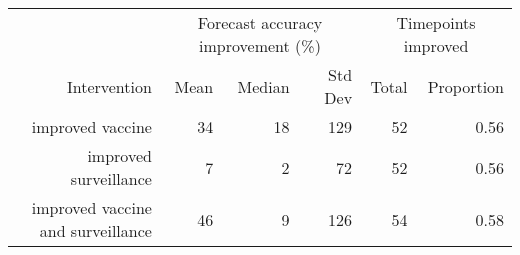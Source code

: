 
\begin{tabular*}{1.0\textwidth}{rrrrrr}
\toprule
             & \multicolumn{3}{c}{Forecast accuracy improvement (\%)} & \multicolumn{2}{c}{Timepoints improved} \\
Intervention & Mean & Median & Std Dev & Total & Proportion \\
\midrule

improved vaccine & 34 & 18 & 129 & 52 & 0.56 \\
improved surveillance & 7 & 2 & 72 & 52 & 0.56 \\
improved vaccine and surveillance & 46 & 9 & 126 & 54 & 0.58 \\

\bottomrule
\end{tabular*}

